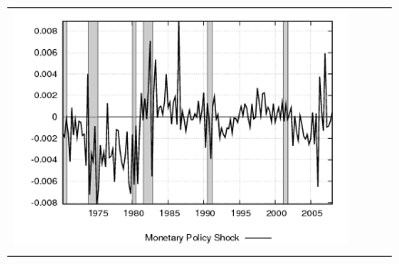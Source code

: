\begin{figure}
\begin{tabular}{cccc}
\includegraphics[scale=0.22]{results_re/mpshock.png} \\ \\ 
 

\end{tabular}
\end{figure}
